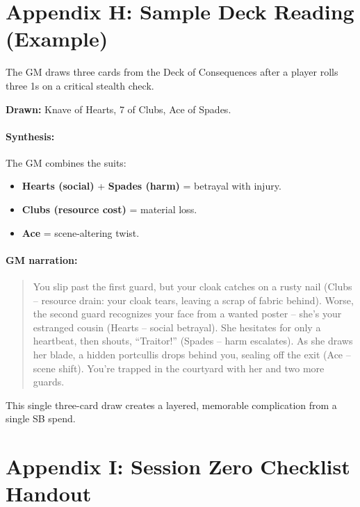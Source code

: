 \clearpage
\section*{Appendix H: Sample Deck Reading (Example)}
\label{app:sample-reading}

The GM draws three cards from the Deck of Consequences after a player rolls three 1s on a critical stealth check.

\textbf{Drawn:} Knave of Hearts, 7 of Clubs, Ace of Spades.

\paragraph{Synthesis:} The GM combines the suits:
\begin{itemize}
  \item \textbf{Hearts (social)} + \textbf{Spades (harm)} = betrayal with injury.
  \item \textbf{Clubs (resource cost)} = material loss.
  \item \textbf{Ace} = scene-altering twist.
\end{itemize}

\paragraph{GM narration:}
\begin{quote}
\textquotedbl You slip past the first guard, but your cloak catches on a rusty nail (Clubs -- resource drain: your cloak tears, leaving a scrap of fabric behind). Worse, the second guard recognizes your face from a wanted poster -- she's your estranged cousin (Hearts -- social betrayal). She hesitates for only a heartbeat, then shouts, ``Traitor!'' (Spades -- harm escalates). As she draws her blade, a hidden portcullis drops behind you, sealing off the exit (Ace -- scene shift). You're trapped in the courtyard with her and two more guards.\textquotedbl
\end{quote}

\noindent This single three-card draw creates a layered, memorable complication from a single SB spend.

\clearpage
\section*{Appendix I: Session Zero Checklist Handout}
\label{app:session-zero-handout}


